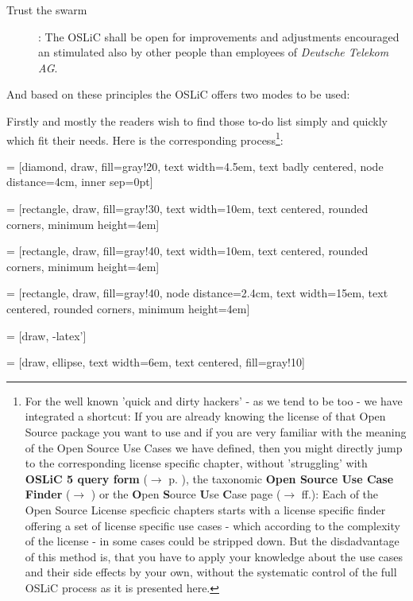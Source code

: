 \begin{description}
  \item[Trust the swarm]: The OSLiC shall be open for improvements and
  adjustments encouraged an stimulated also by other people than employees of
  \emph{Deutsche Telekom AG}.
\end{description}

And based on these principles the OSLiC offers two modes to be used:

Firstly and mostly the readers wish to find those to-do list simply and quickly
which fit their needs. Here is the corresponding process\footnote{For the
well known 'quick and dirty hackers' - as we tend to be too - we have integrated
a shortcut: If you are already knowing the license of that Open Source package
you want to use and if you are very familiar with the meaning of the Open Source
Use Cases we have defined, then you might directly jump to the corresponding
license specific chapter, without 'struggling' with \textbf{OSLiC 5 query form}
($\rightarrow$ p. \pageref{OSLiCStandardFormForGatheringInformation}), the
taxonomic \textbf{Open Source Use Case Finder} ($\rightarrow$
\pageref{OSLiCUseCaseFinder}) or the \textbf{O}pen \textbf{S}ource \textbf{U}se
\textbf{C}ase page ($\rightarrow$ \pageref{OSUCList}ff.): Each of the Open
Source License specficic chapters starts with a license specific finder offering
a set of license specific use cases - which according to the complexity of the
license - in some cases could be stripped down. But the disdadvantage of this
method is, that you have to apply your knowledge about the use cases and their
side effects by your own, without the systematic control of the full OSLiC
process as it is presented here.
}:

 = [diamond, draw, fill=gray!20, 
    text width=4.5em, text badly centered, node distance=4cm, inner sep=0pt]

 = [rectangle, draw, fill=gray!30, 
    text width=10em, text centered, rounded corners, minimum height=4em]
 
 = [rectangle, draw, fill=gray!40, 
    text width=10em, text centered, rounded corners, minimum height=4em]
    
 = [rectangle, draw, fill=gray!40, node distance=2.4cm,
    text width=15em, text centered, rounded corners, minimum height=4em]
    
 = [draw, -latex']

 = [draw, ellipse, text width=6em, text centered, fill=gray!10]
 
